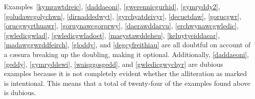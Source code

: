 Examples~\ref{kymrawtdreic},   \ref{daddaeoni},  \ref{gwerennicgurhid},  \ref{gymryddy2}, \ref{goludawcgolychwn},  \ref{dirnaddedwyt},  \ref{gyrchyatdeivyr},  \ref{decuetdaw},  \ref{gorucgwr},  \ref{orucgwyrthuawr},  \ref{goruynawcgorprwy},  \ref{daerawddarvu},  \ref{erchwynawcgwledic},  \ref{gwledicgwlad},  \ref{gwledicgwladoet},  \ref{maeystawddeheu},  \ref{keluytyeiddaear},  \ref{madawggwrddfeirch}, \ref{gloddy}, and \ref{degcyfreithiau} are all doubtful on account of a c\ae sura breaking up the doubling, making it optional. Additionally, \ref{daddaeoni}, \ref{geddy}, \ref{gymryddewi}, \ref{waisggosgedd}, and \ref{gwledicgwychyr} are dubious examples because it is not completely evident whether the alliteration as marked is intentional. This means that a total of twenty-four of the examples found above is dubious.

